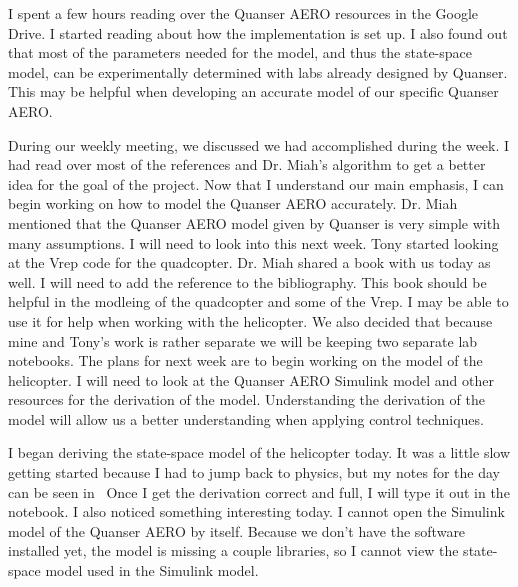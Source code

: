 \documentclass[fontsize=11pt, %
                             paper=letter, %
                             twoside, %
                             captions=tableheading,
                             index=totoc,
                             hyperref]{labbook}
\begin{document}
\begin{addmargin}[0cm]{0cm}

I spent a few hours reading over the Quanser AERO resources in the Google Drive. I started reading about how the implementation is set up. I also found out that most of the parameters needed for the model, and thus the state-space model, can be experimentally determined with labs already designed by Quanser. This may be helpful when developing an accurate model of our specific Quanser AERO.

During our weekly meeting, we discussed we had accomplished during the week. I had read over most of the references and Dr. Miah's algorithm to get a better idea for the goal of the project. Now that I understand our main emphasis, I can begin working on how to model the Quanser AERO accurately. Dr. Miah mentioned that the Quanser AERO model given by Quanser is very simple with many assumptions. I will need to look into this next week. Tony started looking at the Vrep code for the quadcopter.
\bigbreak \noindent
Dr. Miah shared a book with us today as well. I will need to add the reference to the bibliography. This book should be helpful in the modleing of the quadcopter and some of the Vrep. I may be able to use it for help when working with the helicopter. We also decided that because mine and Tony's work is rather separate we will be keeping two separate lab notebooks.
\bigbreak \noindent
The plans for next week are to begin working on the model of the helicopter. I will need to look at the Quanser AERO Simulink model and other resources for the derivation of the model. Understanding the derivation of the model will allow us a better understanding when applying control techniques.

I began deriving the state-space model of the helicopter today. It was a little slow getting started because I had to jump back to physics, but my notes for the day can be seen in~%
Once I get the derivation correct and full, I will type it out in the notebook.
\bigbreak \noindent
I also noticed something interesting today. I cannot open the Simulink model of the Quanser AERO by itself. Because we don't have the software installed yet, the model is missing a couple libraries, so I cannot view the state-space model used in the Simulink model.
%


\end{addmargin}
\end{document}
